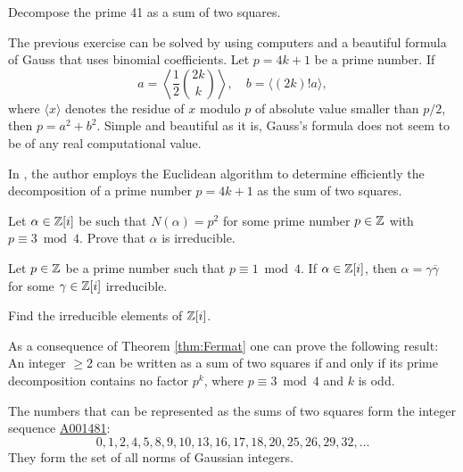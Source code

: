 \begin{exercise}
    Decompose the prime 41 as a sum of two squares. 
\end{exercise}

The previous exercise can be solved by using computers and 
a beautiful formula of Gauss that uses binomial coefficients. Let $p=4k+1$ be a prime number. 
If 
\[
a=\left\langle \frac12\binom{2k}{k}\right\rangle, 
\quad
b=\langle (2k)!a\rangle,
\]
where $\langle x\rangle$ denotes the 
residue of $x$ modulo $p$ of absolute value smaller than $p/2$, 
then $p=a^2+b^2$. Simple and beautiful as it is, Gauss's formula does not seem to be of any real computational value. 

In \cite{MR1041889}, the author employs the Euclidean algorithm to determine efficiently 
the decomposition of a prime number $p=4k+1$ as the sum of two squares.

\begin{exercise}
\label{xca:p=3(4)}
    Let $\alpha\in\mathbb{Z}[i]$ be such that $N(\alpha)=p^2$ 
    for some prime number $p\in\mathbb{Z}$ with $p\equiv3\bmod 4$. 
    Prove that $\alpha$ is irreducible. 
\end{exercise}

\begin{exercise}
    \label{xca:p=1(4)}
    Let $p\in\mathbb{Z}$ be a prime number such that $p\equiv1\bmod 4$.
    If $\alpha\in\mathbb{Z}[i]$, then $\alpha=\gamma\overline{\gamma}$
    for some $\gamma\in\mathbb{Z}[i]$ irreducible. 
\end{exercise}

\begin{exercise}
\label{xca:Z[i]irreducibles}
Find the irreducible elements of $\mathbb{Z}[i]$. 
\end{exercise}

As a consequence of Theorem \ref{thm:Fermat}
one can prove the following result: An integer $\geq2$ can be written as a sum of two squares if and only if its prime decomposition contains no factor $p^k$, where 
$p\equiv 3\bmod 4$ 
and $k$ is odd. 

The numbers that can be represented as the sums of two squares form the integer sequence \href{https://oeis.org/A001481}{A001481}: 
\[
0, 1, 2, 4, 5, 8, 9, 10, 13, 16, 17, 18, 20, 25, 26, 29, 32,\dots 
\] 
They form the set of all norms of Gaussian integers. 


